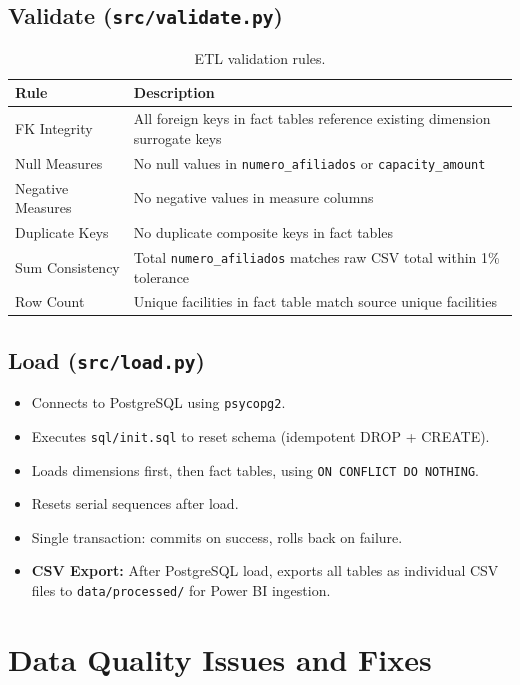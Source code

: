 \documentclass[12pt,a4paper]{article}
\begin{document}
\subsection{Validate (\texttt{src/validate.py})}

\begin{table}[H]
\centering
\small
\begin{tabularx}{\textwidth}{p{3.5cm} X}
\toprule
\textbf{Rule} & \textbf{Description}\\
\midrule
FK Integrity & All foreign keys in fact tables reference existing dimension surrogate keys\\
Null Measures & No null values in \texttt{numero\_afiliados} or \texttt{capacity\_amount}\\
Negative Measures & No negative values in measure columns\\
Duplicate Keys & No duplicate composite keys in fact tables\\
Sum Consistency & Total \texttt{numero\_afiliados} matches raw CSV total within 1\% tolerance\\
Row Count & Unique facilities in fact table match source unique facilities\\
\bottomrule
\end{tabularx}
\caption{ETL validation rules.}
\end{table}

\subsection{Load (\texttt{src/load.py})}

\begin{itemize}[nosep]
    \item Connects to PostgreSQL using \texttt{psycopg2}.
    \item Executes \texttt{sql/init.sql} to reset schema (idempotent DROP + CREATE).
    \item Loads dimensions first, then fact tables, using \texttt{ON CONFLICT DO NOTHING}.
    \item Resets serial sequences after load.
    \item Single transaction: commits on success, rolls back on failure.
    \item \textbf{CSV Export:} After PostgreSQL load, exports all tables as individual CSV files to \texttt{data/processed/} for Power BI ingestion.
\end{itemize}

\section{Data Quality Issues and Fixes}
\end{document}
